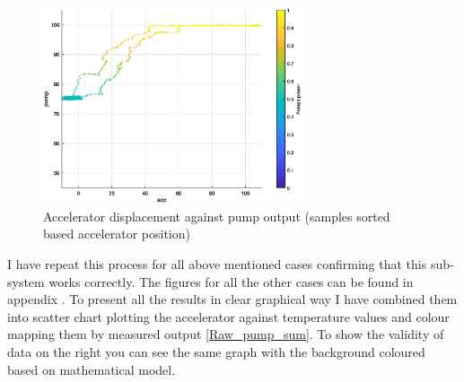 \begin{figure}[h]
    \centering
    \includegraphics[height=5.8cm]{figures/pump_50_1.eps}
    \caption[Accelerator displacement against pump output]{Accelerator displacement against pump output (samples sorted based accelerator position)}
    \label{pump_50_1}
\end{figure}

I have repeat this process for all above mentioned cases confirming that this sub-system works correctly. The figures for all the other cases can be found in appendix . To present all the results in clear graphical way I have combined them into scatter chart plotting the accelerator against temperature values and colour mapping them by measured output \ref{Raw_pump_sum}. To show the validity of data on the right you can see the same graph with the background coloured based on mathematical model.

